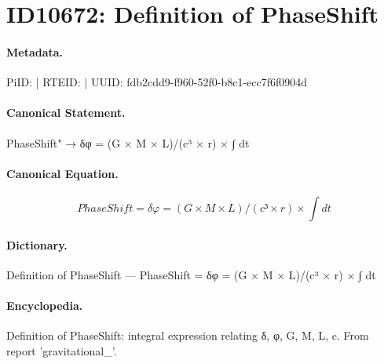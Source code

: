 \section*{ID10672: Definition of PhaseShift}
\paragraph{Metadata.}
PiID:  | RTEID:  | UUID: fdb2cdd9-f960-52f0-b8c1-ecc7f6f0904d

\paragraph{Canonical Statement.}
PhaseShift" → δφ = (G × M × L)/(c³ × r) × ∫ dt

\paragraph{Canonical Equation.}
\[
PhaseShift = δφ = (G × M × L)/(c³ × r) × ∫ dt
\]

\paragraph{Dictionary.}
Definition of PhaseShift — PhaseShift = δφ = (G × M × L)/(c³ × r) × ∫ dt

\paragraph{Encyclopedia.}
Definition of PhaseShift: integral expression relating δ, φ, G, M, L, c. From report 'gravitational\_'.
